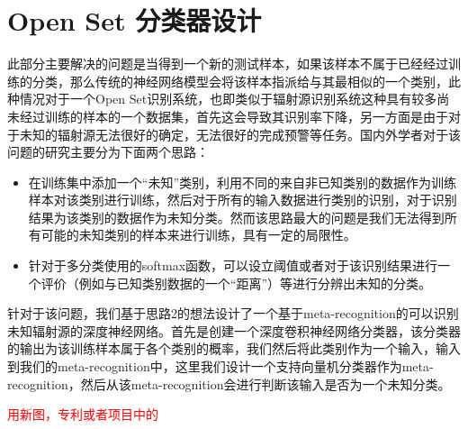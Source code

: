 \section{Open Set 分类器设计}
此部分主要解决的问题是当得到一个新的测试样本，如果该样本不属于已经经过训练的分类，那么传统的神经网络模型会将该样本指派给与其最相似的一个类别，此种情况对于一个Open Set识别系统，也即类似于辐射源识别系统这种具有较多尚未经过训练的样本的一个数据集，首先这会导致其识别率下降，另一方面是由于对于未知的辐射源无法很好的确定，无法很好的完成预警等任务。国内外学者对于该问题的研究主要分为下面两个思路：
\begin{itemize}
	\item 在训练集中添加一个“未知”类别，利用不同的来自非已知类别的数据作为训练样本对该类别进行训练，然后对于所有的输入数据进行类别的识别，对于识别结果为该类别的数据作为未知分类。然而该思路最大的问题是我们无法得到所有可能的未知类别的样本来进行训练，具有一定的局限性。
	\item 针对于多分类使用的softmax函数，可以设立阈值或者对于该识别结果进行一个评价（例如与已知类别数据的一个“距离”）等进行分辨出未知的分类。
\end{itemize}
针对于该问题，我们基于思路2的想法设计了一个基于meta-recognition的可以识别未知辐射源的深度神经网络。首先是创建一个深度卷积神经网络分类器，该分类器的输出为该训练样本属于各个类别的概率，我们然后将此类别作为一个输入，输入到我们的meta-recognition中，这里我们设计一个支持向量机分类器作为meta-recognition，然后从该meta-recognition会进行判断该输入是否为一个未知分类。

\textcolor{red}{用新图，专利或者项目中的}

